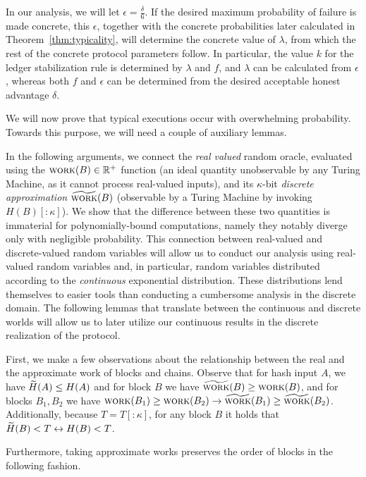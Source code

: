 In our analysis, we will let $\epsilon = \frac{\delta}{6}$. If the desired
maximum probability of failure is made concrete, this $\epsilon$, together
with the concrete probabilities later calculated in Theorem~\ref{thm:typicality},
will determine the concrete value of $\lambda$, from which the rest of the
concrete protocol parameters follow. In particular, the value $k$
for the ledger stabilization rule is
determined by $\lambda$ and $f$, and $\lambda$ can be calculated from $\epsilon$,
whereas both $f$ and $\epsilon$ can be determined from the desired acceptable
honest advantage $\delta$.

We will now prove that typical executions occur with overwhelming probability.
Towards this purpose, we will need a couple of auxiliary lemmas.

In the following arguments, we connect the \emph{real valued}
random oracle, evaluated using the $\textsc{work}(B) \in \mathbb{R}^+$
function (an ideal quantity
unobservable by any Turing Machine, as it cannot process real-valued
inputs), and its $\kappa$-bit \emph{discrete approximation} $\widetilde{\textsc{work}}(B)$ (observable by
a Turing Machine by invoking $H(B)[{:}{\kappa}]$). We show that the
difference between these two quantities is immaterial for polynomially-bound
computations, namely they notably diverge only with negligible probability.
This connection between real-valued and discrete-valued
random variables will allow us to conduct our analysis using real-valued
random variables and, in particular, random variables distributed according to the
\emph{continuous} exponential distribution. These distributions lend themselves
to easier tools than conducting a cumbersome analysis in the discrete domain.
The following lemmas that translate between the continuous and discrete worlds
will allow us to later utilize our continuous results in the discrete
realization of the protocol.

First, we make a few observations about the relationship
between the real and the approximate work of blocks and chains.
Observe that for hash input $A$, we have
$\widetilde{H}(A) \leq H(A)$ and for block $B$ we have
$\widetilde{\textsc{work}}(B) \geq \textsc{work}(B)$,
and for blocks $B_1, B_2$ we have
$\textsc{work}(B_1) \geq \textsc{work}(B_2) \rightarrow \widetilde{\textsc{work}}(B_1) \geq \widetilde{\textsc{work}}(B_2)$.
Additionally, because $T = T[{:}\kappa]$, for any block $B$ it holds
that $\widetilde{H}(B) < T \leftrightarrow H(B) < T$.

Furthermore, taking approximate works preserves
the order of blocks in the following fashion.

